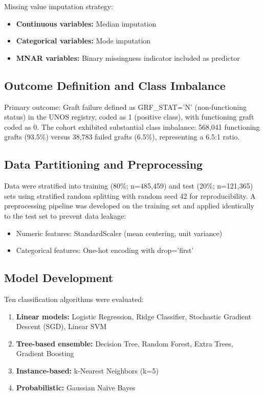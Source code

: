 \documentclass[11pt,a4paper]{article}
\begin{document}
Missing value imputation strategy:
\begin{itemize}
    \item \textbf{Continuous variables:} Median imputation
    \item \textbf{Categorical variables:} Mode imputation
    \item \textbf{MNAR variables:} Binary missingness indicator included as predictor
\end{itemize}

\subsection{Outcome Definition and Class Imbalance}

Primary outcome: Graft failure defined as GRF\_STAT='N' (non-functioning status) in the UNOS registry, coded as 1 (positive class), with functioning graft coded as 0. The cohort exhibited substantial class imbalance: 568,041 functioning grafts (93.5\%) versus 38,783 failed grafts (6.5\%), representing a 6.5:1 ratio.

\subsection{Data Partitioning and Preprocessing}

Data were stratified into training (80\%; n=485,459) and test (20\%; n=121,365) sets using stratified random splitting with random seed 42 for reproducibility. A preprocessing pipeline was developed on the training set and applied identically to the test set to prevent data leakage:
\begin{itemize}
    \item Numeric features: StandardScaler (mean centering, unit variance)
    \item Categorical features: One-hot encoding with drop='first'
\end{itemize}

\subsection{Model Development}

Ten classification algorithms were evaluated:

\begin{enumerate}
    \item \textbf{Linear models:} Logistic Regression, Ridge Classifier, Stochastic Gradient Descent (SGD), Linear SVM
    \item \textbf{Tree-based ensemble:} Decision Tree, Random Forest, Extra Trees, Gradient Boosting
    \item \textbf{Instance-based:} k-Nearest Neighbors (k=5)
    \item \textbf{Probabilistic:} Gaussian Naïve Bayes
\end{enumerate}
\end{document}
